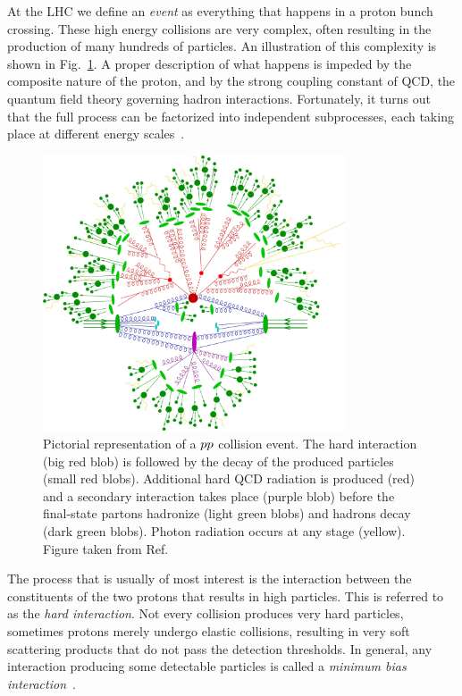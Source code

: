 
At the LHC we define an \textit{event} as everything that happens in a proton bunch crossing.
These high energy collisions are very complex, often resulting in the production of many hundreds of
particles. An illustration of this complexity is shown in Fig.~\ref{fig:event_full_event}.
A proper description of what happens is impeded by the composite nature of the proton, and by the
strong coupling constant of QCD, the quantum field theory governing hadron
interactions.
Fortunately, it turns out that the full process can be factorized into independent subprocesses,
each taking place at different energy scales~\cite{Skands:2011pf}. 


\begin{figure}[htpb]
  \centering
  \includegraphics[width=0.8\textwidth]{figures/eventreco_event/full_event}
  \caption{Pictorial representation of a ${p}{p}$ collision event.
The hard interaction (big red blob) is followed by the decay of the produced particles (small red
blobs).
Additional hard QCD radiation is produced (red) and a secondary interaction takes place (purple
blob) before the final-state partons hadronize (light green blobs) and hadrons decay (dark green
blobs). Photon radiation occurs at any stage (yellow). Figure taken from
Ref.~\cite{Gleisberg:2008ta}
  \label{fig:event_full_event}}
\end{figure}


The process that is usually of most interest is the interaction between the constituents of the two
protons that results in high \pt particles. This is referred to as the \textit{hard interaction}. 
Not every collision produces very hard particles, sometimes protons merely undergo elastic
collisions, resulting in very soft scattering products that do not pass the detection thresholds. In
general, any interaction producing some detectable particles is called a \textit{minimum bias
interaction}~\cite{Field:2012jv}. 


